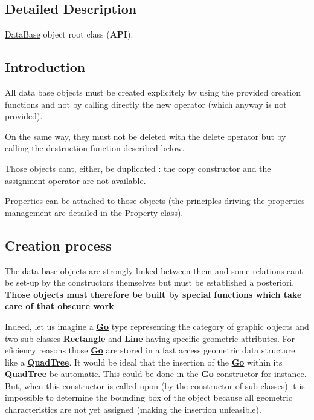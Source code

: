 \subsection{Detailed Description}
\hyperlink{classHurricane_1_1DataBase}{Data\+Base} object root class ({\bfseries A\+PI}). 

\hypertarget{classHurricane_1_1DBo_sDBoIntro}{}\subsection{Introduction}\label{classHurricane_1_1DBo_sDBoIntro}
All data base objects must be created explicitely by using the provided creation functions and not by calling directly the new operator (which anyway is not provided).

On the same way, they must not be deleted with the delete operator but by calling the destruction function described below.

Those objects can\textquotesingle{}t, either, be duplicated \+: the copy constructor and the assignment operator are not available.

Properties can be attached to those objects (the principles driving the properties management are detailed in the \hyperlink{classHurricane_1_1Property}{Property} class).\hypertarget{classHurricane_1_1DBo_sDBoCreation}{}\subsection{Creation process}\label{classHurricane_1_1DBo_sDBoCreation}
The data base objects are strongly linked between them and some relations can\textquotesingle{}t be set-\/up by the constructors themselves but must be established a posteriori. {\bfseries Those objects must therefore be built by special functions which take care of that obscure work}.

Indeed, let us imagine a {\bfseries \hyperlink{classHurricane_1_1Go}{Go}} type representing the category of graphic objects and two sub-\/classes {\bfseries Rectangle} and {\bfseries Line} having specific geometric attributes. For eficiency reasons those {\bfseries \hyperlink{classHurricane_1_1Go}{Go}} are stored in a fast access geometric data structure like a {\bfseries \hyperlink{classHurricane_1_1QuadTree}{Quad\+Tree}}. It would be ideal that the insertion of the {\bfseries \hyperlink{classHurricane_1_1Go}{Go}} within its {\bfseries \hyperlink{classHurricane_1_1QuadTree}{Quad\+Tree}} be automatic. This could be done in the {\bfseries \hyperlink{classHurricane_1_1Go}{Go}} constructor for instance. But, when this constructor is called upon (by the constructor of sub-\/classes) it is impossible to determine the bounding box of the object because all geometric characteristics are not yet assigned (making the insertion unfeasible).

